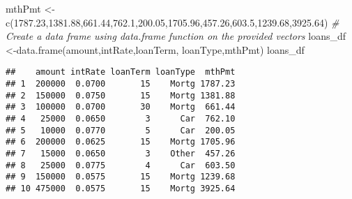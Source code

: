 \documentclass[
]{article}
\newenvironment{Shaded}{\begin{snugshade}}{\end{snugshade}}
\newcommand{\CommentTok}[1]{\textcolor[rgb]{0.56,0.35,0.01}{\textit{#1}}}
\newcommand{\FloatTok}[1]{\textcolor[rgb]{0.00,0.00,0.81}{#1}}
\newcommand{\FunctionTok}[1]{\textcolor[rgb]{0.00,0.00,0.00}{#1}}
\newcommand{\NormalTok}[1]{#1}
\newcommand{\OtherTok}[1]{\textcolor[rgb]{0.56,0.35,0.01}{#1}}
\begin{document}
\begin{Shaded}
\begin{Highlighting}[]
\NormalTok{mthPmt }\OtherTok{\textless{}{-}} \FunctionTok{c}\NormalTok{(}\FloatTok{1787.23}\NormalTok{,}\FloatTok{1381.88}\NormalTok{,}\FloatTok{661.44}\NormalTok{,}\FloatTok{762.1}\NormalTok{,}\FloatTok{200.05}\NormalTok{,}\FloatTok{1705.96}\NormalTok{,}\FloatTok{457.26}\NormalTok{,}\FloatTok{603.5}\NormalTok{,}\FloatTok{1239.68}\NormalTok{,}\FloatTok{3925.64}\NormalTok{)}
\CommentTok{\# Create a data frame using data.frame function on the provided vectors}
\NormalTok{loans\_df }\OtherTok{\textless{}{-}}\FunctionTok{data.frame}\NormalTok{(amount,intRate,loanTerm, loanType,mthPmt)}
\NormalTok{loans\_df}
\end{Highlighting}
\end{Shaded}

\begin{verbatim}
##    amount intRate loanTerm loanType  mthPmt
## 1  200000  0.0700       15    Mortg 1787.23
## 2  150000  0.0750       15    Mortg 1381.88
## 3  100000  0.0700       30    Mortg  661.44
## 4   25000  0.0650        3      Car  762.10
## 5   10000  0.0770        5      Car  200.05
## 6  200000  0.0625       15    Mortg 1705.96
## 7   15000  0.0650        3    Other  457.26
## 8   25000  0.0775        4      Car  603.50
## 9  150000  0.0575       15    Mortg 1239.68
## 10 475000  0.0575       15    Mortg 3925.64
\end{verbatim}
\end{document}
